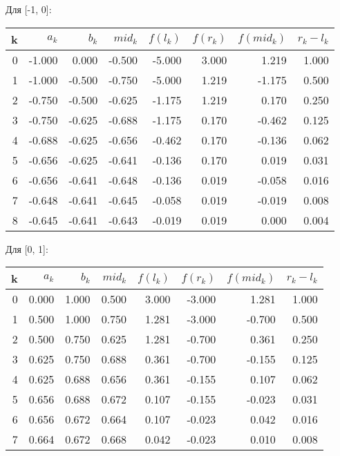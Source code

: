 \documentclass[]{article}
\begin{document}
Для [-1, 0]:
\begin{center}
\begin{tabular}{ |r|r r r r r r r| }
\hline
k & $a_k$ & $b_k$ & $mid_k$ & $f(l_k)$ & $f(r_k)$ & $f(mid_k)$ & $r_k-l_k$\\ 	
\hline
0 & -1.000 & 0.000 & -0.500 & -5.000 & 3.000 & 1.219 & 1.000 \\
1 & -1.000 & -0.500 & -0.750 & -5.000 & 1.219 & -1.175 & 0.500 \\
2 & -0.750 & -0.500 & -0.625 & -1.175 & 1.219 & 0.170 & 0.250 \\
3 & -0.750 & -0.625 & -0.688 & -1.175 & 0.170 & -0.462 & 0.125 \\
4 & -0.688 & -0.625 & -0.656 & -0.462 & 0.170 & -0.136 & 0.062 \\
5 & -0.656 & -0.625 & -0.641 & -0.136 & 0.170 & 0.019 & 0.031 \\
6 & -0.656 & -0.641 & -0.648 & -0.136 & 0.019 & -0.058 & 0.016 \\
7 & -0.648 & -0.641 & -0.645 & -0.058 & 0.019 & -0.019 & 0.008 \\
8 & -0.645 & -0.641 & -0.643 & -0.019 & 0.019 & 0.000 & 0.004 \\
\hline
\end{tabular}
\end{center}

Для [0, 1]:
\begin{center}
\begin{tabular}{ |r|r r r r r r r| }
\hline
k & $a_k$ & $b_k$ & $mid_k$ & $f(l_k)$ & $f(r_k)$ & $f(mid_k)$ & $r_k-l_k$\\
\hline
0 & 0.000 & 1.000 & 0.500 & 3.000 & -3.000 & 1.281 & 1.000 \\
1 & 0.500 & 1.000 & 0.750 & 1.281 & -3.000 & -0.700 & 0.500 \\
2 & 0.500 & 0.750 & 0.625 & 1.281 & -0.700 & 0.361 & 0.250 \\
3 & 0.625 & 0.750 & 0.688 & 0.361 & -0.700 & -0.155 & 0.125 \\
4 & 0.625 & 0.688 & 0.656 & 0.361 & -0.155 & 0.107 & 0.062 \\
5 & 0.656 & 0.688 & 0.672 & 0.107 & -0.155 & -0.023 & 0.031 \\
6 & 0.656 & 0.672 & 0.664 & 0.107 & -0.023 & 0.042 & 0.016 \\
7 & 0.664 & 0.672 & 0.668 & 0.042 & -0.023 & 0.010 & 0.008 \\
\hline
\end{tabular}
\end{center}
\end{document}
